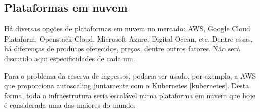 
\subsection{Plataformas em nuvem}

Há diversas opções de plataformas em nuvem no mercado: AWS, Google Cloud Plataform,
Openstack Cloud, Microsoft Azure, Digital Ocean, etc. Dentre essas, há diferenças
de produtos oferecidos, preços, dentre outros fatores. Não será discutido aqui
especificidades de cada um.

Para o problema da reserva de ingressos, poderia ser usado, por exemplo, a AWS
que proporciona autoscaling \cite{aws-autoscaling} juntamente com o
Kubernetes \autoref{kubernetes}.
Desta forma, toda a infraestrutura seria escalável numa plataforma em nuvem
que hoje é considerada uma das maiores do mundo.

%
%
%
%
%
%
%
%
%
%
%
%
%
%
%
%
%
%
%
%
